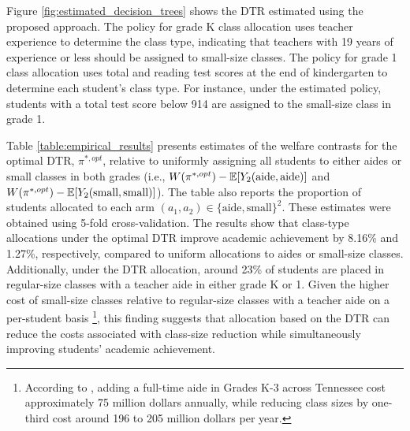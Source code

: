 
Figure \ref{fig:estimated_decision_trees} shows the DTR estimated using the proposed approach. The policy for grade K class allocation uses teacher experience to determine the class type, indicating that teachers with 19 years of experience or less should be assigned to small-size classes. The policy for grade 1 class allocation uses total and reading test scores at the end of kindergarten to determine each student's class type. For instance, under the estimated policy, students with a total test score below 914 are assigned to the small-size class in grade 1.




Table \ref{table:empirical_results} presents estimates of the welfare contrasts for the optimal DTR, $\pi^{\ast,opt}$, relative to uniformly assigning all students to either aides or small classes in both grades (i.e., $W(\pi^{\ast,opt}) - \mathbb{E}[Y_2(\text{aide},\text{aide})]$ and $W(\pi^{\ast,opt}) - \mathbb{E}[Y_2(\text{small},\text{small})]$). The table also reports the proportion of students allocated to each arm $(a_1,a_2) \in \{\text{aide},\text{small}\}^2$. These estimates were obtained using 5-fold cross-validation. The results show that class-type allocations under the optimal DTR improve academic achievement by 8.16\% and 1.27\%, respectively, compared to uniform allocations to aides or small-size classes. Additionally, under the DTR allocation, around 23\% of students are placed in regular-size classes with a teacher aide in either grade K or 1. Given the higher cost of small-size classes relative to regular-size classes with a teacher aide on a per-student basis \citep{Word_et_al_1990}\footnote{According to \cite{Word_et_al_1990}, adding a full-time aide in Grades K-3 across Tennessee cost approximately 75 million dollars annually, while reducing class sizes by one-third cost around 196 to 205 million dollars per year.}, this finding suggests that allocation based on the DTR can reduce the costs associated with class-size reduction while simultaneously improving students' academic achievement.


